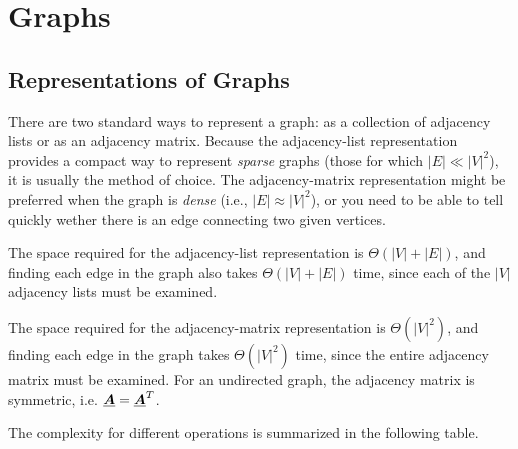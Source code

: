 





\section{Graphs}\label{sec:graphs}
\subsection{Representations of Graphs}
There are two standard ways to represent a graph: as a collection of adjacency lists or as an adjacency matrix.
Because the adjacency-list representation provides a compact way to represent \emph{sparse} graphs (those for which \(|E| \ll |V|^2\)), it is usually the method of choice.
The adjacency-matrix representation might be preferred when the graph is \emph{dense} (i.e., \(|E| \approx |V|^2\)), or you need to be able to tell quickly wether there is an edge connecting two given vertices.

The space required for the adjacency-list representation is \(\Theta(|V| + |E|)\), and finding each edge in the graph also takes \(\Theta(|V| + |E|)\) time, since each of the \(|V|\) adjacency lists must be examined.

The space required for the adjacency-matrix representation is \(\Theta(|V|^2)\), and finding each edge in the graph takes \(\Theta(|V|^2)\) time, since the entire adjacency matrix must be examined.
For an undirected graph, the adjacency matrix is symmetric, i.e. $\underline{\boldsymbol{A}} = \underline{\boldsymbol{A}}^T$.

The complexity for different operations is summarized in the following table.





